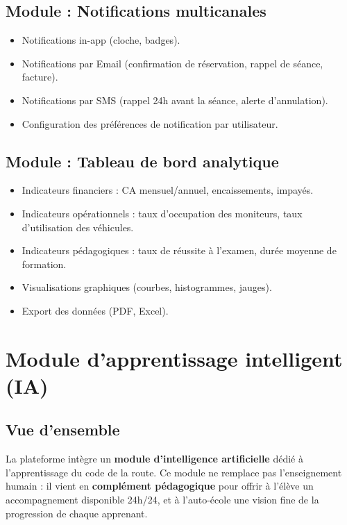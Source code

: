 \documentclass[12pt,a4paper]{article}
\newcommand{\highlight}[1]{\textbf{\color{primary}#1}}
\begin{document}
\subsection{Module : Notifications multicanales}

\begin{itemize}[leftmargin=*,itemsep=4pt]
    \item Notifications in-app (cloche, badges).
    \item Notifications par Email (confirmation de réservation, rappel de séance, facture).
    \item Notifications par SMS (rappel 24h avant la séance, alerte d'annulation).
    \item Configuration des préférences de notification par utilisateur.
\end{itemize}

\subsection{Module : Tableau de bord analytique}

\begin{itemize}[leftmargin=*,itemsep=4pt]
    \item Indicateurs financiers : CA mensuel/annuel, encaissements, impayés.
    \item Indicateurs opérationnels : taux d'occupation des moniteurs, taux d'utilisation des véhicules.
    \item Indicateurs pédagogiques : taux de réussite à l'examen, durée moyenne de formation.
    \item Visualisations graphiques (courbes, histogrammes, jauges).
    \item Export des données (PDF, Excel).
\end{itemize}

\newpage

\section{Module d'apprentissage intelligent (IA)}

\subsection{Vue d'ensemble}

La plateforme intègre un \highlight{module d'intelligence artificielle} dédié à l'apprentissage du code de la route. Ce module ne remplace pas l'enseignement humain : il vient en \textbf{complément pédagogique} pour offrir à l'élève un accompagnement disponible 24h/24, et à l'auto-école une vision fine de la progression de chaque apprenant.
\end{document}
